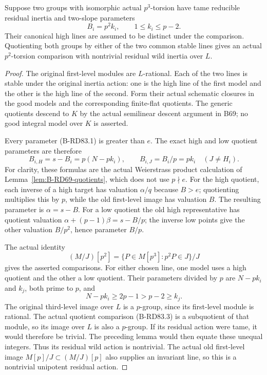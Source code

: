 \begin{lemma}
\label{lem:B-RD83-quotients}
Suppose two groups with isomorphic actual \(p^3\)-torsion
have tame reducible residual inertia and two-slope parameters
\[
                 B_i=p^2k_i,\qquad1\le k_i\le p-2.
                                                        \tag{B-RD83.1}
\]
Their canonical high lines are assumed to be distinct under
the comparison. Quotienting both groups by either of the two
common stable lines gives an actual \(p^2\)-torsion comparison
with nontrivial residual wild inertia over \(L\).
\end{lemma}
\begin{proof}
The original first-level modules are \(L\)-rational. Each
of the two lines is stable under the original inertia action:
one is the high line of the first model and the other is
the high line of the second. Form their actual schematic
closures in the good models and the corresponding finite-flat
quotients. The generic quotients descend to \(K\) by the
actual semilinear descent argument in B69; no good integral
model over \(K\) is asserted.

Every parameter (B-RD83.1) is greater than \(e\).
The exact high and low quotient parameters are therefore
\[
            B_{i,H}=s-B_i=p(N-pk_i),
       \qquad B_{i,J}=B_i/p=pk_i\quad(J\ne H_i).
                                                        \tag{B-RD83.2}
\]
For clarity, these formulas are the actual Weierstrass
product calculation of Lemma~\ref{lem:B-RD69-quotients},
which does not use \(p\nmid e\). For the high quotient,
each inverse of a high target has valuation \(\alpha/q\)
because \(B>e\); quotienting multiplies this by \(p\),
while the old first-level image has valuation \(B\).
The resulting parameter is \(\alpha=s-B\). For a low
quotient the old high representative has quotient valuation
\(\alpha+(p-1)\beta=s-B/p\); the inverse low points
give the other valuation \(B/p^2\), hence parameter \(B/p\).

The actual identity
\[
 (M/J)[p^2]=\{P\in M[p^3]:p^2P\in J\}/J              \tag{B-RD83.3}
\]
gives the asserted comparisons. For either chosen line,
one model uses a high quotient and the other a low quotient.
Their parameters divided by \(p\) are \(N-pk_i\) and
\(k_j\), both prime to \(p\), and
\[
                  N-pk_i\ge2p-1>p-2\ge k_j.          \tag{B-RD83.4}
\]
The original third-level image over \(L\) is a
\(p\)-group, since its first-level module is rational.
The actual quotient comparison (B-RD83.3) is a subquotient
of that module, so its image over \(L\) is also a
\(p\)-group. If its residual action were tame, it would
therefore be trivial. The preceding lemma would then
equate these unequal integers. Thus its residual wild
action is nontrivial. The actual old first-level image
\(M[p]/J\subset(M/J)[p]\) also supplies an invariant
line, so this is a nontrivial unipotent residual action.
\end{proof}

